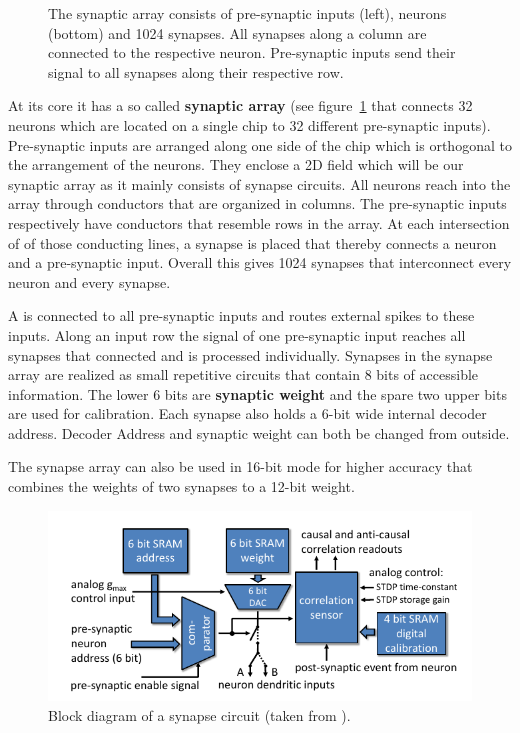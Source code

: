 \begin{figure}[h!]
    \centering
    
    \caption{\label{fig:array} The synaptic array consists of pre-synaptic inputs (left), neurons (bottom) and 1024 synapses. All synapses along a column are connected to the respective neuron. Pre-synaptic inputs send their signal to all synapses along their respective row.}
\end{figure}
At its core it has a so called \textbf{synaptic array} (see figure~\ref{fig:array} that connects 32 neurons which are located on a single chip to 32 different pre-synaptic inputs).
Pre-synaptic inputs are arranged along one side of the chip which is orthogonal to the arrangement of the neurons.
They enclose a 2D field which will be our synaptic array as it mainly consists of synapse circuits.
All neurons reach into the array through conductors that are organized in columns.
The pre-synaptic inputs respectively have conductors that resemble rows in the array.
At each intersection of of those conducting lines, a synapse is placed that thereby connects a neuron and a pre-synaptic input.
Overall this gives 1024 synapses that interconnect every neuron and every synapse.

A  is connected to all pre-synaptic inputs and routes external spikes to these inputs.
Along an input row the signal of one pre-synaptic input reaches all synapses that connected and is processed individually.
Synapses in the synapse array are realized as small repetitive circuits that contain 8 bits of accessible information.
The lower 6 bits are \textbf{synaptic weight} and the spare two upper bits are used for calibration.
Each synapse also holds a 6-bit wide internal decoder address.
Decoder Address and synaptic weight can both be changed from outside.

The synapse array can also be used in 16-bit mode for higher accuracy that combines the weights of two synapses to a 12-bit weight.
\begin{figure}[htbp]
    \centering
    \includegraphics[width=\textwidth]{pictures/syncircuit.png}
    \caption{\label{fig:circuit} Block diagram of a synapse circuit (taken from \cite{PPU}).}
\end{figure}

